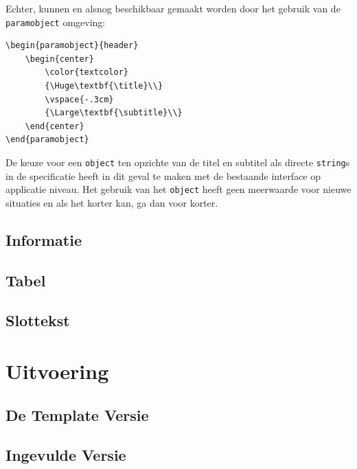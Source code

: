 \documentclass[dutch]{ltugboat}
\begin{document}
    Echter, kunnen  en  alsnog beschikbaar gemaakt worden door het gebruik van de \texttt{paramobject} omgeving:
    \begin{lstlisting}[language={[LaTeX]TeX}]
\begin{paramobject}{header}
    \begin{center}
        \color{textcolor}
        {\Huge\textbf{\title}\\}
        \vspace{-.3cm}
        {\Large\textbf{\subtitle}\\}
    \end{center}
\end{paramobject}
    \end{lstlisting}
    De keuze voor een \texttt{object} ten opzichte van de titel en subtitel als directe \texttt{string}s in de specificatie heeft in dit geval te maken met de bestaande interface op applicatie niveau.
    Het gebruik van het \texttt{object} heeft geen meerwaarde voor nieuwe situaties en als het korter kan, ga dan voor korter.


    \subsection{Informatie}

    \subsection{Tabel}

    \subsection{Slottekst}

    \section{Uitvoering}
    \subsection{De Template Versie}
    \setlength\fboxsep{0pt}

    \subsection{Ingevulde Versie}
\end{document}
